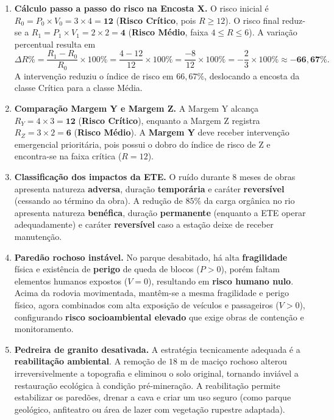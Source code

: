 \begin{boxGabarito}
\begin{enumerate}[leftmargin=1.8em, itemsep=4pt, start=6]
  \item \textbf{Cálculo passo a passo do risco na Encosta X.}
  O risco inicial é $R_0 = P_0 \times V_0 = 3 \times 4 = \mathbf{12}$ (\textbf{Risco Crítico}, pois $R \ge 12$). O risco final reduz-se a $R_1 = P_1 \times V_1 = 2 \times 2 = \mathbf{4}$ (\textbf{Risco Médio}, faixa $4 \le R \le 6$). A variação percentual resulta em
  \[
  \Delta R\% = \frac{R_1 - R_0}{R_0} \times 100\% = \frac{4 - 12}{12} \times 100\% = \frac{-8}{12} \times 100\% = -\frac{2}{3} \times 100\% \approx \mathbf{-66{,}67\%}.
  \]
  A intervenção reduziu o índice de risco em $66{,}67\%$, deslocando a encosta da classe Crítica para a classe Média.
  \item \textbf{Comparação Margem Y e Margem Z.}
  A Margem Y alcança $R_Y = 4 \times 3 = \mathbf{12}$ (\textbf{Risco Crítico}), enquanto a Margem Z registra $R_Z = 3 \times 2 = \mathbf{6}$ (\textbf{Risco Médio}). A \textbf{Margem Y} deve receber intervenção emergencial prioritária, pois possui o dobro do índice de risco de Z e encontra-se na faixa crítica ($R = 12$).
  \item \textbf{Classificação dos impactos da ETE.}
  O ruído durante 8 meses de obras apresenta natureza \textbf{adversa}, duração \textbf{temporária} e caráter \textbf{reversível} (cessando ao término da obra). A redução de $85\%$ da carga orgânica no rio apresenta natureza \textbf{benéfica}, duração \textbf{permanente} (enquanto a ETE operar adequadamente) e caráter \textbf{reversível} caso a estação deixe de receber manutenção.
  \item \textbf{Paredão rochoso instável.}
  No parque desabitado, há alta \textbf{fragilidade} física e existência de \textbf{perigo} de queda de blocos ($P > 0$), porém faltam elementos humanos expostos ($V = 0$), resultando em \textbf{risco humano nulo}. Acima da rodovia movimentada, mantêm-se a mesma fragilidade e perigo físico, agora combinados com alta exposição de veículos e passageiros ($V > 0$), configurando \textbf{risco socioambiental elevado} que exige obras de contenção e monitoramento.
  \item \textbf{Pedreira de granito desativada.} A estratégia tecnicamente adequada é a \textbf{reabilitação ambiental}. A remoção de $18\text{ m}$ de maciço rochoso alterou irreversivelmente a topografia e eliminou o solo original, tornando inviável a restauração ecológica à condição pré-mineração. A reabilitação permite estabilizar os paredões, drenar a cava e criar um uso seguro (como parque geológico, anfiteatro ou área de lazer com vegetação rupestre adaptada).
\end{enumerate}
\end{boxGabarito}

